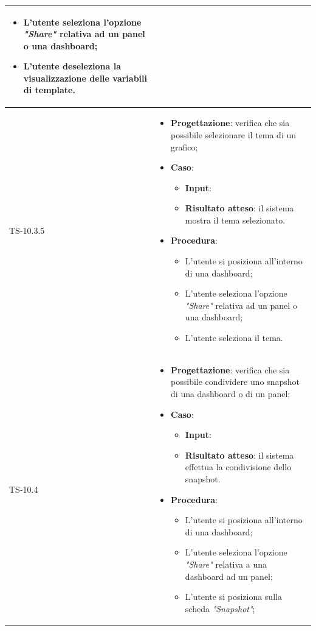\begin{longtable}{|C{2.5cm}|C{13cm}|}
\begin{itemize}
\begin{itemize}
		\item L'utente seleziona l'opzione \emph{"Share"} relativa ad un panel o una dashboard;
		\item L'utente deseleziona la visualizzazione delle variabili di template.
	\end{itemize} 
\end{itemize}
	  \\
	\hline
	{TS-10.3.5} &
\begin{itemize}
	\item \textbf{Progettazione}: verifica che sia possibile selezionare il
	tema di un grafico;
	\item \textbf{Caso}: 
	\begin{itemize}
		\item \textbf{Input}: 
		\item \textbf{Risultato atteso}: il sistema mostra il tema selezionato.
	\end{itemize}
	\item \textbf{Procedura}:
	\begin{itemize}
		\item L'utente si posiziona all'interno di una dashboard;
		\item L'utente seleziona l'opzione \emph{"Share"} relativa ad un panel o una dashboard;
		\item L'utente seleziona il tema.
	\end{itemize} 
\end{itemize}
	  \\
	\hline
	{TS-10.4} & 
\begin{itemize}
	\item \textbf{Progettazione}: verifica che sia possibile condividere uno
	snapshot di una dashboard o di un panel;
	\item \textbf{Caso}: 
	\begin{itemize}
		\item \textbf{Input}: 
		\item \textbf{Risultato atteso}: il sistema effettua la condivisione dello snapshot.
	\end{itemize}
	\item \textbf{Procedura}:
	\begin{itemize}
		\item L'utente si posiziona all'interno di una dashboard;
		\item L'utente seleziona l'opzione \emph{"Share"} relativa a una dashboard ad un panel;
		\item L'utente si posiziona sulla scheda \emph{"Snapshot"};

\end{itemize}
\end{itemize}
\end{longtable}
